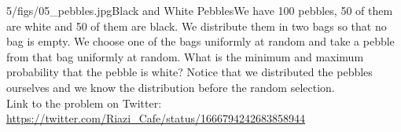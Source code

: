 \begin{problem}{5/figs/05_pebbles.jpg}{Black and White Pebbles}We have 100 pebbles, 50 of them are white and 50 of them are black. We distribute them in two bags so that no bag is empty. We choose one of the bags uniformly at random and take a pebble from that bag uniformly at random. What is the minimum and maximum probability that the pebble is white? Notice that we distributed the pebbles ourselves and we know the distribution before the random selection.\\[0.2cm]

Link to the problem on Twitter:  \url{https://twitter.com/Riazi_Cafe/status/1666794242683858944}\end{problem}